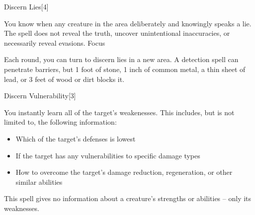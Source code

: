 \begin{spellsection}{Discern Lies}[4]
    \begin{spellheader}
    \end{spellheader}
    \begin{spellcontent}
        \begin{spelltargetinginfo}
        \end{spelltargetinginfo}
        \begin{spelleffects}
            \spelleffect You know when any creature in the area deliberately and knowingly speaks a lie. The spell does not reveal the truth, uncover unintentional inaccuracies, or necessarily reveal evasions.
            \spelldur Focus
        \end{spelleffects}
    \end{spellcontent}
    \begin{spellfooter}
        \spellnotes Each round, you can turn to discern lies in a new area. A detection spell can penetrate barriers, but 1 foot of stone, 1 inch of common metal, a thin sheet of lead, or 3 feet of wood or dirt blocks it.
        \miscastexplode
    \end{spellfooter}
\end{spellsection}

\begin{spellsection}{Discern Vulnerability}[3]
    \begin{spellheader}
    \end{spellheader}
    \begin{spellcontent}
        \begin{spelltargetinginfo}
        \end{spelltargetinginfo}
        \begin{spelleffects}
            \spelleffect You instantly learn all of the target's weakenesses. This includes, but is not limited to, the following information:
            \begin{itemize}
                \item Which of the target's defenses is lowest
                \item If the target has any vulnerabilities to specific damage types
                \item How to overcome the target's damage reduction, regeneration, or other similar abilities
            \end{itemize}
        \end{spelleffects}
    \end{spellcontent}
    \begin{spellfooter}
        \spellnotes This spell gives no information about a creature's strengths or abilities -- only its weaknesses.
        \miscastrandom
    \end{spellfooter}
\end{spellsection}

